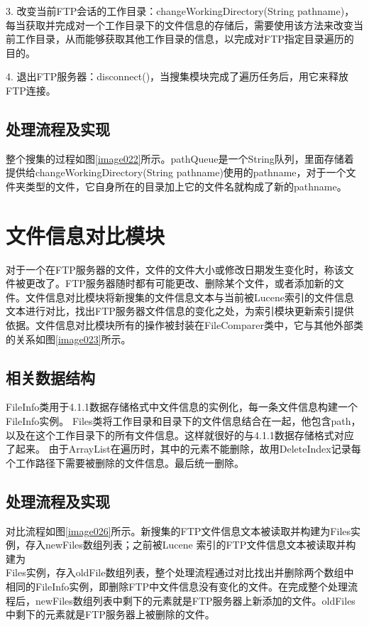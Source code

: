 3. 改变当前FTP会话的工作目录：changeWorkingDirectory(String pathname)，每当获取并完成对一个工作目录下的文件信息的存储后，需要使用该方法来改变当前工作目录，从而能够获取其他工作目录的信息，以完成对FTP指定目录遍历的目的。

4. 退出FTP服务器：disconnect()，当搜集模块完成了遍历任务后，用它来释放FTP连接。
\subsection{处理流程及实现}
整个搜集的过程如图\ref{image022}所示。pathQueue是一个String队列，里面存储着提供给changeWorkingDirectory(String pathname)使用的pathname，对于一个文件夹类型的文件，它自身所在的目录加上它的文件名就构成了新的pathname。


\section{文件信息对比模块}
对于一个在FTP服务器的文件，文件的文件大小或修改日期发生变化时，称该文件被更改了。FTP服务器随时都有可能更改、删除某个文件，或者添加新的文件。文件信息对比模块将新搜集的文件信息文本与当前被Lucene索引的文件信息文本进行对比，找出FTP服务器文件信息的变化之处，为索引模块更新索引提供依据。文件信息对比模块所有的操作被封装在FileComparer类中，它与其他外部类的关系如图\ref{image023}所示。


\subsection{相关数据结构}
FileInfo类用于4.1.1数据存储格式中文件信息的实例化，每一条文件信息构建一个FileInfo实例。
Files类将工作目录和目录下的文件信息结合在一起，他包含path，以及在这个工作目录下的所有文件信息。这样就很好的与4.1.1数据存储格式对应了起来。
由于ArrayList在遍历时，其中的元素不能删除，故用Delete\-Index记录每个工作路径下需要被删除的文件信息。最后统一删除。
\subsection{处理流程及实现}
对比流程如图\ref{image026}所示。新搜集的FTP文件信息文本被读取并构建为Files实例，存入newFiles数组列表；之前被Lucene 索引的FTP文件信息文本被读取并构建为\\Files实例，存入oldFile数组列表，整个处理流程通过对比找出并删除两个数组中相同的FileInfo实例，即删除FTP中文件信息没有变化的文件。在完成整个处理流程后，newFiles数组列表中剩下的元素就是FTP服务器上新添加的文件。oldFiles中剩下的元素就是FTP服务器上被删除的文件。
\newpage
{}

